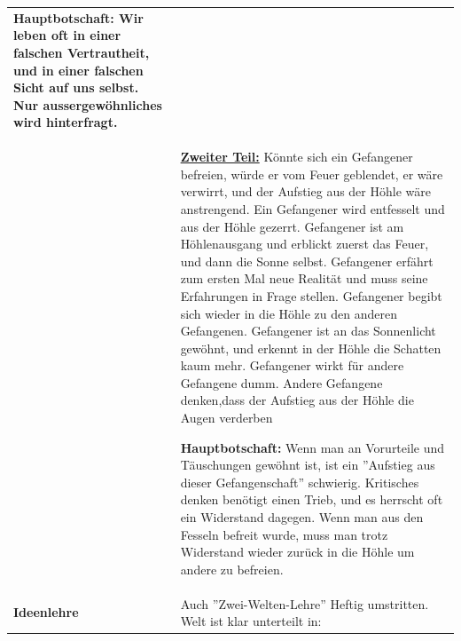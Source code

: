 \begin{longtable}{>{\bfseries}p{}p{}}
						 \textbf{Hauptbotschaft:} Wir leben oft in einer falschen Vertrautheit, und in einer falschen Sicht auf uns selbst. Nur aussergewöhnliches wird hinterfragt.
						\\
					& \textbf{\underline{Zweiter Teil:}} \newline
						Könnte sich ein Gefangener befreien, würde er vom Feuer geblendet, er wäre verwirrt, und der Aufstieg aus der Höhle wäre anstrengend.\newline
						Ein Gefangener wird entfesselt und aus der Höhle gezerrt.\newline
						Gefangener ist am Höhlenausgang und erblickt zuerst das Feuer, und dann die Sonne selbst.\newline
						Gefangener erfährt zum ersten Mal neue Realität und muss seine Erfahrungen in Frage stellen.\newline 
						Gefangener begibt sich wieder in die Höhle zu den anderen Gefangenen.\newline
						Gefangener ist an das Sonnenlicht gewöhnt, und erkennt in der Höhle die Schatten kaum mehr.\newline
						Gefangener wirkt für andere Gefangene dumm.\newline
						Andere Gefangene denken,dass der Aufstieg aus der Höhle die Augen verderben\newline
						
						 \textbf{Hauptbotschaft:} Wenn man an Vorurteile und Täuschungen gewöhnt ist, ist ein ''Aufstieg aus dieser Gefangenschaft'' schwierig. Kritisches denken benötigt einen Trieb, und es herrscht oft ein Widerstand dagegen. Wenn man aus den Fesseln befreit wurde, muss man trotz Widerstand wieder zurück in die Höhle um andere zu befreien.
						\\
			\hline
			Ideenlehre
				& Auch ''Zwei-Welten-Lehre''\newline
					Heftig umstritten.\newline
					Welt ist klar unterteilt in:
					
					\vspace{2mm}
					

\end{longtable}
